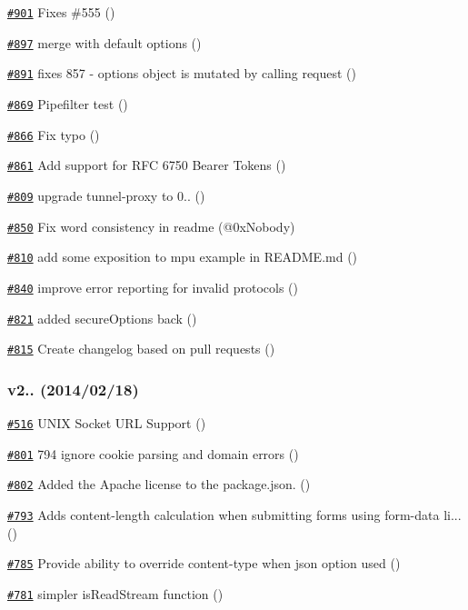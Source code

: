 \begin{DoxyItemize}
\item \href{https://github.com/request/request/pull/901}{\tt \#901} Fixes \#555 ()
\item \href{https://github.com/request/request/pull/897}{\tt \#897} merge with default options ()
\item \href{https://github.com/request/request/pull/891}{\tt \#891} fixes 857 -\/ options object is mutated by calling request ()
\item \href{https://github.com/request/request/pull/869}{\tt \#869} Pipefilter test ()
\item \href{https://github.com/request/request/pull/866}{\tt \#866} Fix typo ()
\item \href{https://github.com/request/request/pull/861}{\tt \#861} Add support for R\+FC 6750 Bearer Tokens ()
\item \href{https://github.com/request/request/pull/809}{\tt \#809} upgrade tunnel-\/proxy to 0.. ()
\item \href{https://github.com/request/request/pull/850}{\tt \#850} Fix word consistency in readme (@0x\+Nobody)
\item \href{https://github.com/request/request/pull/810}{\tt \#810} add some exposition to mpu example in R\+E\+A\+D\+M\+E.\+md ()
\item \href{https://github.com/request/request/pull/840}{\tt \#840} improve error reporting for invalid protocols ()
\item \href{https://github.com/request/request/pull/821}{\tt \#821} added secure\+Options back ()
\item \href{https://github.com/request/request/pull/815}{\tt \#815} Create changelog based on pull requests ()
\end{DoxyItemize}

\subsubsection*{v2.. (2014/02/18)}


\begin{DoxyItemize}
\item \href{https://github.com/request/request/pull/516}{\tt \#516} U\+N\+IX Socket U\+RL Support ()
\item \href{https://github.com/request/request/pull/801}{\tt \#801} 794 ignore cookie parsing and domain errors ()
\item \href{https://github.com/request/request/pull/802}{\tt \#802} Added the Apache license to the package.\+json. ()
\item \href{https://github.com/request/request/pull/793}{\tt \#793} Adds content-\/length calculation when submitting forms using form-\/data li... ()
\item \href{https://github.com/request/request/pull/785}{\tt \#785} Provide ability to override content-\/type when {\ttfamily json} option used ()
\item \href{https://github.com/request/request/pull/781}{\tt \#781} simpler is\+Read\+Stream function ()
\end{DoxyItemize}

